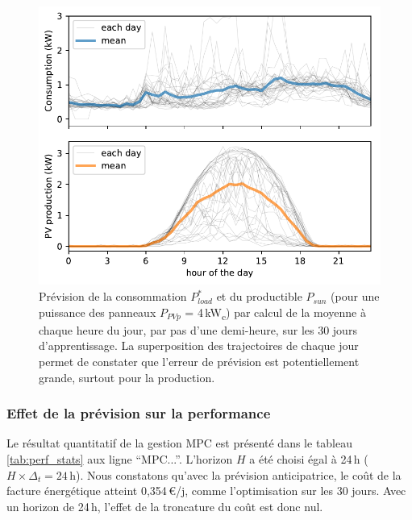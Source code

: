 \documentclass[a4paper,10pt,twocolumn]{article}
\newcommand\sub[1]{\textsubscript{#1}}
\begin{document}
\begin{figure}
        \begin{center}
                \includegraphics[width=1\columnwidth]{figures/daily_traj_M-1-2011-11-28_PV4kWp.pdf}
        \end{center}

        \caption{Prévision de la consommation $P_{load}^*$ et du productible $P_{sun}$
        (pour une puissance des panneaux $P_{PVp}$ = 4\,kW\sub{c})
        par calcul de la moyenne à chaque heure du jour, par pas d'une demi-heure,
        sur les 30 jours d'apprentissage.
        La superposition des trajectoires de chaque jour permet de constater
        que l'erreur de prévision est potentiellement grande, surtout pour la production.
        }
        \label{fig:pred}
\end{figure}

\subsubsection{Effet de la prévision sur la performance}

Le résultat quantitatif de la gestion MPC est présenté dans le tableau \ref{tab:perf_stats}
aux ligne ``MPC...''. L'horizon $H$ a été choisi égal à 24\,h ($H \times \Delta_t = 24$\,h).
Nous constatons qu'avec la prévision anticipatrice, le coût de la facture énergétique
atteint 0,354\,€/j, comme l'optimisation sur les 30 jours.
Avec un horizon de 24\,h, l'effet de la troncature du coût est donc nul.
\end{document}
